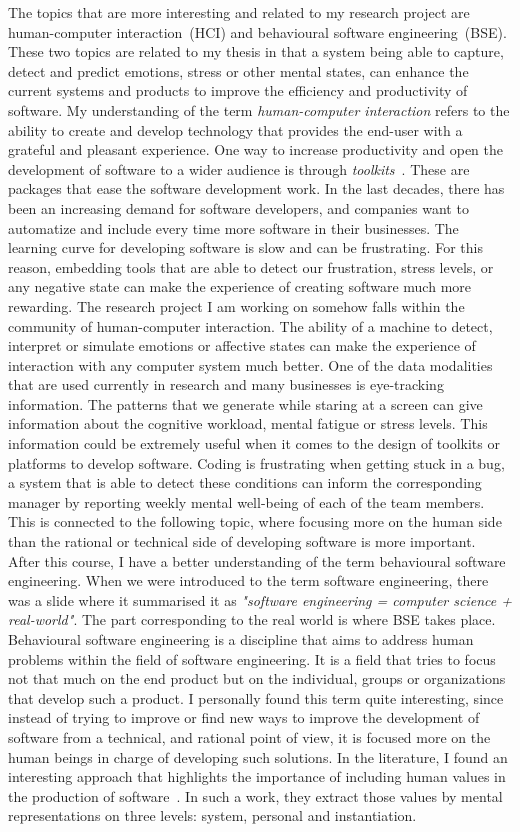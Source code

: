 \documentclass[11pt]{article}
\begin{document}
The topics that are more interesting and related to my research project are human-computer interaction~(HCI) and behavioural software engineering~(BSE). These two topics are related to my thesis in that a system being able to capture, detect and predict emotions, stress or other mental states, can enhance the current systems and products to improve the efficiency and productivity of software. 
My understanding of the term \textit{human-computer interaction} refers to the ability to create and develop technology that provides the end-user with a grateful and pleasant experience. One way to increase productivity and open the development of software to a wider audience is through \textit{toolkits}~\cite{hci-toolkit}. These are packages that ease the software development work. In the last decades, there has been an increasing demand for software developers, and companies want to automatize and include every time more software in their businesses. The learning curve for developing software is slow and can be frustrating. For this reason, embedding tools that are able to detect our frustration, stress levels, or any negative state can make the experience of creating software much more rewarding. The research project I am working on somehow falls within the community of human-computer interaction. The ability of a machine to detect, interpret or simulate emotions or affective states can make the experience of interaction with any computer system much better. One of the data modalities that are used currently in research and many businesses is eye-tracking information. The patterns that we generate while staring at a screen can give information about the cognitive workload, mental fatigue or stress levels. This information could be extremely useful when it comes to the design of toolkits or platforms to develop software. Coding is frustrating when getting stuck in a bug, a system that is able to detect these conditions can inform the corresponding manager by reporting weekly mental well-being of each of the team members. This is connected to the following topic, where focusing more on the human side than the rational or technical side of developing software is more important.
After this course, I have a better understanding of the term behavioural software engineering. When we were introduced to the term software engineering, there was a slide where it summarised it as \textit{"software engineering = computer science  + real-world"}. The part corresponding to the real world is where BSE takes place. Behavioural software engineering is a discipline that aims to address human problems within the field of software engineering. It is a field that tries to focus not that much on the end product but on the individual, groups or organizations that develop such a product. I personally found this term quite interesting, since instead of trying to improve or find new ways to improve the development of software from a technical, and rational point of view, it is focused more on the human beings in charge of developing such solutions. In the literature, I found an interesting approach that highlights the importance of including human values in the production of software~\cite{bse-social}. In such a work, they extract those values by mental representations on three levels: system, personal and instantiation. 
\end{document}

